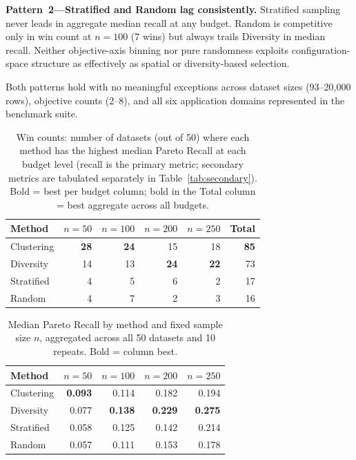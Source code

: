 \documentclass[sigconf,nonacm]{acmart}
\begin{document}
\textbf{Pattern~2---Stratified and Random lag consistently.}
Stratified sampling never leads in aggregate median recall at any budget.
Random is competitive only in win count at $n=100$ (7 wins) but always trails
Diversity in median recall.
Neither objective-axis binning nor pure randomness exploits configuration-space
structure as effectively as spatial or diversity-based selection.

Both patterns hold with no meaningful exceptions across dataset sizes
(93--20,000 rows), objective counts (2--8), and all six application domains
represented in the benchmark suite.

\begin{table}[h]
\caption{Win counts: number of datasets (out of 50) where each method has the
         highest median Pareto Recall at each budget level (recall is the
         primary metric; secondary metrics are tabulated separately in
         Table~\ref{tab:secondary}). Bold = best per budget column;
         bold in the Total column = best aggregate across all budgets.}
\label{tab:wincounts}
\begin{tabular}{lrrrrr}
\toprule
Method      & $n{=}50$ & $n{=}100$ & $n{=}200$ & $n{=}250$ & Total \\
\midrule
Clustering  & \textbf{28} & \textbf{24} & 15          & 18          & \textbf{85} \\
Diversity   & 14          & 13          & \textbf{24} & \textbf{22} & 73          \\
Stratified  &  4          &  5          &  6          &  2          & 17          \\
Random      &  4          &  7          &  2          &  3          & 16          \\
\bottomrule
\end{tabular}
\end{table}

\begin{table}[h]
\caption{Median Pareto Recall by method and fixed sample size $n$, aggregated
         across all 50 datasets and 10 repeats. Bold = column best.}
\label{tab:medianrecall}
\begin{tabular}{lrrrr}
\toprule
Method     & $n{=}50$ & $n{=}100$ & $n{=}200$ & $n{=}250$ \\
\midrule
Clustering & \textbf{0.093} & 0.114          & 0.182          & 0.194          \\
Diversity  & 0.077          & \textbf{0.138} & \textbf{0.229} & \textbf{0.275} \\
Stratified & 0.058          & 0.125          & 0.142          & 0.214          \\
Random     & 0.057          & 0.111          & 0.153          & 0.178          \\
\bottomrule
\end{tabular}
\end{table}
\end{document}
